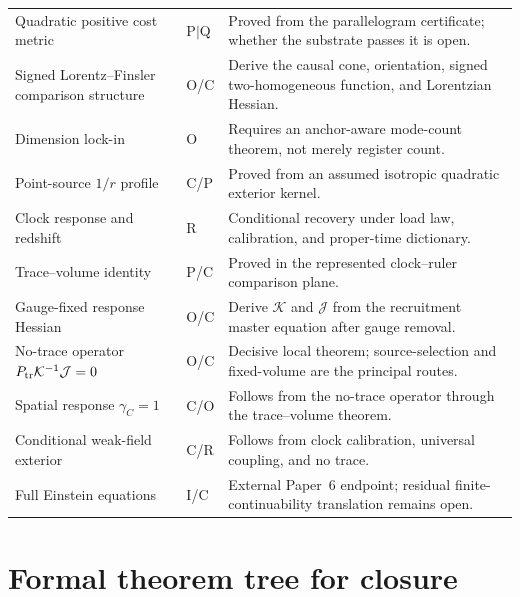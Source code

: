 \documentclass[11pt]{article}
\theoremstyle{remark}
\newcommand{\Status}[1]{\textsf{#1}}
\newcommand{\Ptr}{P_{\rm tr}}
\begin{document}
\begin{longtable}{@{}p{}p{}p{}@{}}
Quadratic positive cost metric & \Status{P$\mid$Q} & Proved from the parallelogram certificate; whether the substrate passes it is open. \\
Signed Lorentz--Finsler comparison structure & \Status{O/C} & Derive the causal cone, orientation, signed two-homogeneous function, and Lorentzian Hessian. \\
Dimension lock-in & \Status{O} & Requires an anchor-aware mode-count theorem, not merely register count. \\
Point-source $1/r$ profile & \Status{C/P} & Proved from an assumed isotropic quadratic exterior kernel. \\
Clock response and redshift & \Status{R} & Conditional recovery under load law, calibration, and proper-time dictionary. \\
Trace--volume identity & \Status{P/C} & Proved in the represented clock--ruler comparison plane. \\
Gauge-fixed response Hessian & \Status{O/C} & Derive $\mathcal K$ and $\mathcal J$ from the recruitment master equation after gauge removal. \\
No-trace operator $\Ptr\mathcal K^{-1}\mathcal J=0$ & \Status{O/C} & Decisive local theorem; source-selection and fixed-volume are the principal routes. \\
Spatial response $\gamma_C=1$ & \Status{C/O} & Follows from the no-trace operator through the trace--volume theorem. \\
Conditional weak-field exterior & \Status{C/R} & Follows from clock calibration, universal coupling, and no trace. \\
Full Einstein equations & \Status{I/C} & External Paper~6 endpoint; residual finite-continuability translation remains open. \\
\bottomrule
\end{longtable}

\section{Formal theorem tree for closure}
\end{document}
